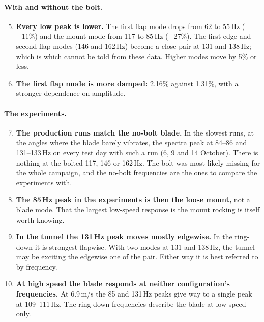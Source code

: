 \documentclass[11pt]{article}
\begin{document}
\paragraph{With and without the bolt.}
\begin{enumerate}
  \setcounter{enumi}{4}
  \item \textbf{Every low peak is lower.} The first flap mode drops from 62
        to 55\,Hz ($-11\%$) and the mount mode from 117 to 85\,Hz
        ($-27\%$). The first edge and second flap modes (146 and 162\,Hz)
        become a close pair at 131 and 138\,Hz; which is which cannot be told
        from these data. Higher modes move by 5\% or less.
  \item \textbf{The first flap mode is more damped:} 2.16\% against 1.31\%,
        with a stronger dependence on amplitude.
\end{enumerate}

\paragraph{The experiments.}
\begin{enumerate}
  \setcounter{enumi}{6}
  \item \textbf{The production runs match the no-bolt blade.} In the slowest
        runs, at the angles where the blade barely vibrates, the spectra peak
        at 84--86 and 131--133\,Hz on every test day with such a run (6, 9 and
        14 October). There is nothing at the bolted 117, 146 or 162\,Hz. The
        bolt was most likely missing for the whole campaign, and the no-bolt
        frequencies are the ones to compare the experiments with.
  \item \textbf{The 85\,Hz peak in the experiments is then the loose mount,}
        not a blade mode. That the largest low-speed response is the mount
        rocking is itself worth knowing.
  \item \textbf{In the tunnel the 131\,Hz peak moves mostly edgewise.} In the
        ring-down it is strongest flapwise. With two modes at 131 and
        138\,Hz, the tunnel may be exciting the edgewise one of the pair.
        Either way it is best referred to by frequency.
  \item \textbf{At high speed the blade responds at neither configuration's
        frequencies.} At 6.9\,m/s the 85 and 131\,Hz peaks give way to a
        single peak at 109--111\,Hz. The ring-down frequencies describe the
        blade at low speed only.
\end{enumerate}
\end{document}
